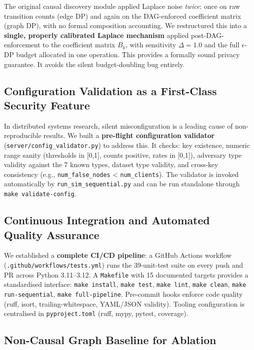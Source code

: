 \documentclass[journal]{IEEEtran}
\begin{document}
The original causal discovery module applied Laplace noise \emph{twice}: once on raw transition counts (edge DP) and again on the DAG-enforced coefficient matrix (graph DP), with no formal composition accounting. We restructured this into a \textbf{single, properly calibrated Laplace mechanism} applied post-DAG-enforcement to the coefficient matrix $B_k$, with sensitivity $\Delta = 1.0$ and the full $\epsilon$-DP budget allocated in one operation. This provides a formally sound privacy guarantee. It avoids the silent budget-doubling bug entirely.

\subsection{Configuration Validation as a First-Class Security Feature}

In distributed systems research, silent misconfiguration is a leading cause of non-reproducible results. We built a \textbf{pre-flight configuration validator} (\texttt{server/config\_validator.py}) to address this. It checks: key existence, numeric range sanity (thresholds in [0,1], counts positive, rates in [0,1]), adversary type validity against the 7 known types, dataset type validity, and cross-key consistency (e.g., \texttt{num\_false\_nodes} < \texttt{num\_clients}). The validator is invoked automatically by \texttt{run\_sim\_sequential.py} and can be run standalone through \texttt{make validate-config}.

\subsection{Continuous Integration and Automated Quality Assurance}

We established a \textbf{complete CI/CD pipeline}: a GitHub Actions workflow (\texttt{.github/workflows/tests.yml}) runs the 39-unit-test suite on every push and PR across Python 3.11--3.12. A \texttt{Makefile} with 15 documented targets provides a standardised interface: \texttt{make install}, \texttt{make test}, \texttt{make lint}, \texttt{make clean}, \texttt{make run-sequential}, \texttt{make full-pipeline}. Pre-commit hooks enforce code quality (ruff, isort, trailing-whitespace, YAML/JSON validity). Tooling configuration is centralised in \texttt{pyproject.toml} (ruff, mypy, pytest, coverage).

\subsection{Non-Causal Graph Baseline for Ablation}
\end{document}
